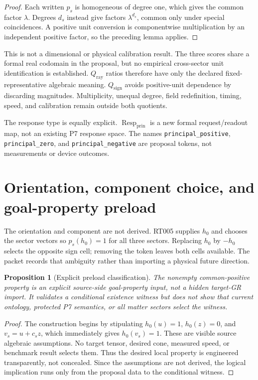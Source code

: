 \documentclass[11pt]{article}
\newtheorem{proposition}{Proposition}
\newcommand{\Resp}{\operatorname{Resp}_{\mathrm{prin}}}
\newcommand{\Qray}{Q_{\mathrm{ray}}}
\newcommand{\Qsign}{Q_{\mathrm{sign}}}
\begin{document}
\begin{proof}
Each written $p_s$ is homogeneous of degree one, which gives the common factor
$\lambda$.  Degrees $d_s$ instead give factors $\lambda^{d_s}$, common only
under special coincidences.  A positive unit conversion is componentwise
multiplication by an independent positive factor, so the preceding lemma
applies.
\end{proof}

This is not a dimensional or physical calibration result.  The three scores
share a formal real codomain in the proposal, but no empirical cross-sector
unit identification is established.  $\Qray$ ratios therefore have only the
declared fixed-representative algebraic meaning.  $\Qsign$ avoids positive-unit
dependence by discarding magnitudes.  Multiplicity, unequal degree, field
redefinition, timing, speed, and calibration remain outside both quotients.

The response type is equally explicit.  $\Resp$ is a new formal request/readout
map, not an existing P7 response space.  The names
\texttt{principal\_positive}, \texttt{principal\_zero}, and
\texttt{principal\_negative} are proposal tokens, not measurements or device
outcomes.

\section{Orientation, component choice, and goal-property preload}

The orientation and component are not derived.  RT005 supplies $h_0$ and
chooses the sector vectors so $p_s(h_0)=1$ for all three sectors.  Replacing
$h_0$ by $-h_0$ selects the opposite sign cell; removing the token leaves both
cells available.  The packet records that ambiguity rather than importing a
physical future direction.

\begin{proposition}[Explicit preload classification]
The nonempty common-positive property is an explicit source-side goal-property
input, not a hidden target-GR import.  It validates a conditional existence
witness but does not show that current ontology, protected P7 semantics, or
all matter sectors select the witness.
\end{proposition}

\begin{proof}
The construction begins by stipulating $h_0(u)=1$, $h_0(z)=0$, and
$v_s=u+c_sz$, which immediately gives $h_0(v_s)=1$.  These are visible
source algebraic assumptions.  No target tensor, desired cone, measured speed,
or benchmark result selects them.  Thus the desired local property is
engineered transparently, not concealed.  Since the assumptions are not
derived, the logical implication runs only from the proposal data to the
conditional witness.
\end{proof}
\end{document}
